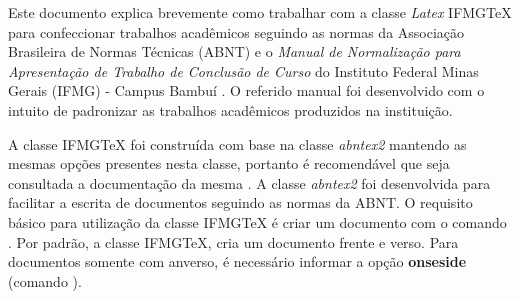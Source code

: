 Este documento explica brevemente como trabalhar com a classe \textit{Latex} {IFMG\TeX} para confeccionar trabalhos acadêmicos seguindo as normas da Associação Brasileira de Normas Técnicas (ABNT) e o \textit{Manual de Normalização para Apresentação de Trabalho de Conclusão de Curso} do Instituto Federal Minas Gerais (IFMG) - Campus Bambuí \cite{castro:2016:manual}.
O referido manual foi desenvolvido com o intuito de padronizar as trabalhos acadêmicos produzidos na instituição.

A classe {IFMG\TeX} foi construída com base na classe \textit{abntex2} mantendo as mesmas opções presentes nesta classe, portanto é recomendável que seja consultada a documentação da mesma \cite{araujo:2016:abntex2}.
A classe \textit{abntex2} foi desenvolvida para facilitar a escrita de documentos seguindo as normas da ABNT.
O requisito básico para utilização da classe {IFMG\TeX} é criar um documento com o comando .
Por padrão, a classe {IFMG\TeX}, cria um documento frente e verso.
Para documentos somente com anverso, é necessário informar a opção \textbf{onseside} (comando ).
